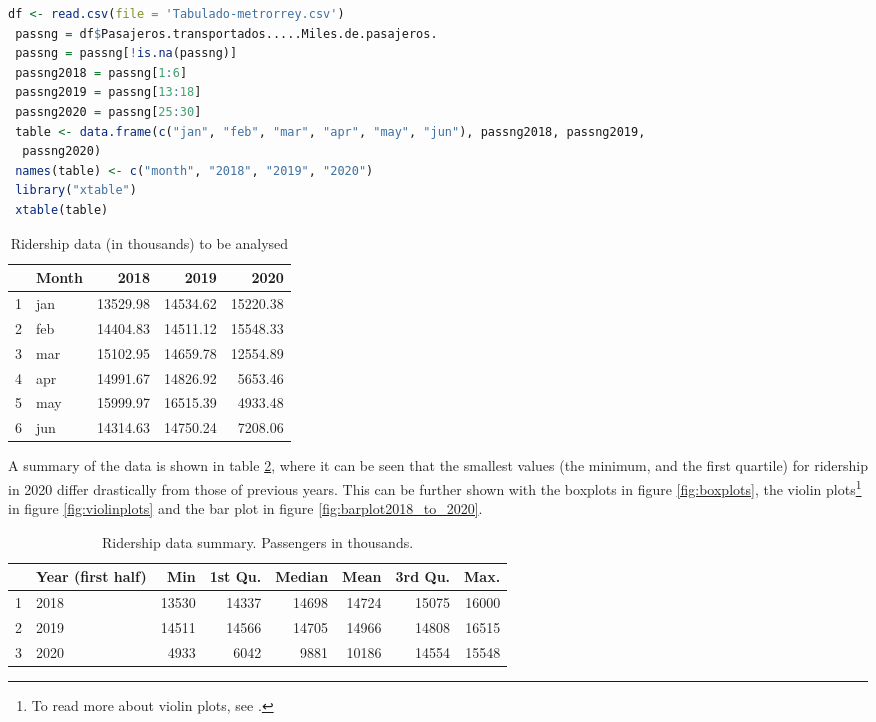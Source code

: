\documentclass[letterpaper, 10 pt, conference]{article}
\begin{document}
 \begin{lstlisting}[language=R]
 df <- read.csv(file = 'Tabulado-metrorrey.csv')
 passng = df$Pasajeros.transportados.....Miles.de.pasajeros.
 passng = passng[!is.na(passng)]
 passng2018 = passng[1:6]
 passng2019 = passng[13:18]
 passng2020 = passng[25:30]
 table <- data.frame(c("jan", "feb", "mar", "apr", "may", "jun"), passng2018, passng2019,
  passng2020)
 names(table) <- c("month", "2018", "2019", "2020")
 library("xtable")
 xtable(table)
 \end{lstlisting}
 
 \begin{table}[h!]
 	\centering
 	\begin{tabular}{rlrrr}
 		\hline
 		& Month & 2018 & 2019 & 2020 \\ 
 		\hline
 		1 & jan & 13529.98 & 14534.62 & 15220.38 \\ 
 		2 & feb & 14404.83 & 14511.12 & 15548.33 \\ 
 		3 & mar & 15102.95 & 14659.78 & 12554.89 \\ 
 		4 & apr & 14991.67 & 14826.92 & 5653.46 \\ 
 		5 & may & 15999.97 & 16515.39 & 4933.48 \\ 
 		6 & jun & 14314.63 & 14750.24 & 7208.06 \\ 
 		\hline
 	\end{tabular}
 	\caption{Ridership data (in thousands) to be analysed}
 	\label{tab:1}
 \end{table}

\newpage 
A summary of the data is shown in table \ref{tab:2}, where it can be seen that the smallest values (the minimum, and the first quartile) for ridership in 2020 differ drastically from those of previous years. This can be further shown with the boxplots in figure \ref{fig:boxplots}, the violin plots\footnote{To read more about violin plots, see \cite{violinplot}.} in figure \ref{fig:violinplots} and the bar plot in figure \ref{fig:barplot2018_to_2020}. 

\begin{table}[h!]
	\centering
	\begin{tabular}{rlrrrrrr}
		\hline
		& Year (first half) & Min & 1st Qu. & Median & Mean & 3rd Qu. & Max.  \\ 
		\hline
		1 & 2018 & 13530 & 14337 & 14698 & 14724 & 15075 & 16000 \\ 
		2 & 2019 & 14511 & 14566 & 14705 & 14966 & 14808 & 16515\\ 
		3 & 2020 & 4933 & 6042 & 9881  & 10186 & 14554 & 15548 \\ 
		\hline
	\end{tabular}
	\caption{Ridership data summary. Passengers in thousands.}
	\label{tab:2}
\end{table}
\end{document}
